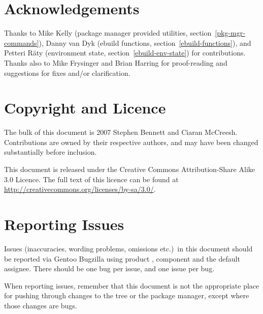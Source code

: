 \section*{Acknowledgements}

Thanks to Mike Kelly (package manager provided utilities, section~\ref{pkg-mgr-commands}),
Danny van Dyk (ebuild functions, section~\ref{ebuild-functions}), and
Petteri Räty (environment state, section~\ref{ebuild-env-state}) for contributions. Thanks also to
Mike Frysinger and Brian Harring for proof-reading and suggestions for fixes and/or clarification.

\section*{Copyright and Licence}

The bulk of this document is \textcopyright{} 2007 Stephen Bennett and Ciaran McCreesh. Contributions
are owned by their respective authors, and may have been changed substantially before inclusion.

This document is released under the Creative Commons Attribution-Share Alike 3.0 Licence. The full
text of this licence can be found at \url{http://creativecommons.org/licenses/by-sa/3.0/}.

\section*{Reporting Issues}

Issues (inaccuracies, wording problems, omissions etc.)\ in this document should be reported via
Gentoo Bugzilla using product , component  and the default
assignee. There should be one bug per issue, and one issue per bug.

When reporting issues, remember that this document is not the appropriate place for pushing
through changes to the tree or the package manager, except where those changes are bugs.



